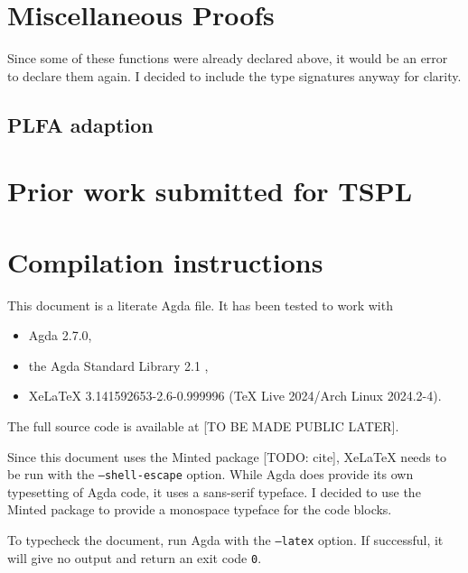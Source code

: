 \documentclass[logo,bsc,singlespacing,parskip,online]{infthesis}
\begin{document}




\appendix

\chapter{Miscellaneous Proofs}
\label{appendix:misc_proofs}

Since some of these functions were already declared above, it would be an error to declare them
again. I decided to include the type signatures anyway for clarity.

\section{PLFA adaption}


\chapter{Prior work submitted for TSPL}
\label{appendix:tspl}


\chapter{Compilation instructions}
\label{appendix:compilation_instructions}

This document is a literate Agda file. It has been tested to work with
\begin{itemize}
  \item Agda 2.7.0,
  \item the Agda Standard Library 2.1 \citep{the_agda_community_agda_2024},
  \item XeLaTeX 3.141592653-2.6-0.999996 (TeX Live 2024/Arch Linux 2024.2-4).
\end{itemize}

The full source code is available at [TO BE MADE PUBLIC LATER].

Since this document uses the Minted package [TODO: cite], XeLaTeX needs to be run with the
\texttt{--shell-escape} option. While Agda does provide its own typesetting of Agda code, it uses a
sans-serif typeface. I decided to use the Minted package to provide a monospace typeface for the
code blocks.

To typecheck the document, run Agda with the \texttt{--latex} option. If successful, it will give no
output and return an exit code \texttt{0}.
\end{document}
